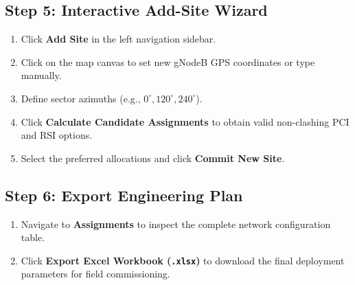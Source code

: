 \documentclass[12pt,a4paper]{article}
\begin{document}
\subsection{Step 5: Interactive Add-Site Wizard}
\begin{enumerate}
    \item Click \textbf{Add Site} in the left navigation sidebar.
    \item Click on the map canvas to set new gNodeB GPS coordinates or type manually.
    \item Define sector azimuths (e.g., $0^\circ, 120^\circ, 240^\circ$).
    \item Click \textbf{Calculate Candidate Assignments} to obtain valid non-clashing PCI and RSI options.
    \item Select the preferred allocations and click \textbf{Commit New Site}.
\end{enumerate}

\subsection{Step 6: Export Engineering Plan}
\begin{enumerate}
    \item Navigate to \textbf{Assignments} to inspect the complete network configuration table.
    \item Click \textbf{Export Excel Workbook (\texttt{.xlsx})} to download the final deployment parameters for field commissioning.
\end{enumerate}
\end{document}
